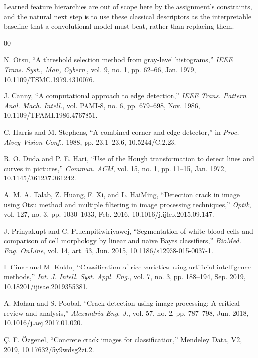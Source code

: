 \documentclass{ieeeaccess}
\begin{document}
Learned feature hierarchies are out of scope here by the assignment's
constraints, and the natural next step is to use these classical descriptors as
the interpretable baseline that a convolutional model must beat, rather than
replacing them.

\begin{thebibliography}{00}

 N. Otsu, ``A threshold selection method from gray-level
histograms,'' \emph{IEEE Trans. Syst., Man, Cybern.}, vol. 9, no. 1, pp. 62--66,
Jan. 1979, 10.1109/TSMC.1979.4310076.

 J. Canny, ``A computational approach to edge detection,''
\emph{IEEE Trans. Pattern Anal. Mach. Intell.}, vol. PAMI-8, no. 6, pp. 679--698,
Nov. 1986, 10.1109/TPAMI.1986.4767851.

 C. Harris and M. Stephens, ``A combined corner and edge
detector,'' in \emph{Proc. Alvey Vision Conf.}, 1988, pp. 23.1--23.6,
10.5244/C.2.23.

 R. O. Duda and P. E. Hart, ``Use of the Hough transformation
to detect lines and curves in pictures,'' \emph{Commun. ACM}, vol. 15, no. 1,
pp. 11--15, Jan. 1972, 10.1145/361237.361242.

 A. M. A. Talab, Z. Huang, F. Xi, and L. HaiMing,
``Detection crack in image using Otsu method and multiple filtering in image
processing techniques,'' \emph{Optik}, vol. 127, no. 3, pp. 1030--1033, Feb.
2016, 10.1016/j.ijleo.2015.09.147.

 J. Prinyakupt and C. Pluempitiwiriyawej,
``Segmentation of white blood cells and comparison of cell morphology by linear
and na\"ive Bayes classifiers,'' \emph{BioMed. Eng. OnLine}, vol. 14, art. 63,
Jun. 2015, 10.1186/s12938-015-0037-1.

 I. Cinar and M. Koklu, ``Classification of rice varieties
using artificial intelligence methods,'' \emph{Int. J. Intell. Syst. Appl. Eng.},
vol. 7, no. 3, pp. 188--194, Sep. 2019, 10.18201/ijisae.2019355381.

 A. Mohan and S. Poobal, ``Crack detection using image
processing: A critical review and analysis,'' \emph{Alexandria Eng. J.}, vol. 57,
no. 2, pp. 787--798, Jun. 2018, 10.1016/j.aej.2017.01.020.

 \c{C}. F. \"Ozgenel, ``Concrete crack images for
classification,'' Mendeley Data, V2, 2019, 10.17632/5y9wdsg2zt.2.


\end{thebibliography}
\end{document}
